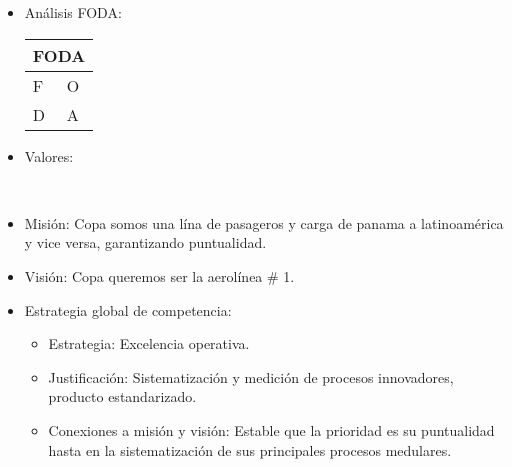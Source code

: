\begin{itemize}
    \item Análisis FODA: 
       \begin{center}
            \begin{tabular}{ | p{1.5cm} | p{1.5cm} | }
                \hline
                \multicolumn{2}{|c|}{FODA} \\ 
                \hline
                F & O \\ 
                D & A \\ 
                \hline
            \end{tabular}
       \end{center}
    
    \item Valores:
        \begin{center} 
             \\ 
        \end{center}
            
    \item Misión: Copa somos una lína de pasageros y carga de panama a latinoamérica y vice versa, garantizando puntualidad.
    \item Visión: Copa queremos ser la aerolínea \# 1.
    
    \item Estrategia global de competencia:
        \begin{itemize}
            \item Estrategia: Excelencia operativa.
            \item Justificación: Sistematización y medición de procesos innovadores, producto estandarizado.
            \item Conexiones a misión y visión: Estable que la prioridad es su puntualidad hasta en la sistematización de sus principales procesos medulares.
        \end{itemize}
    

\end{itemize}
